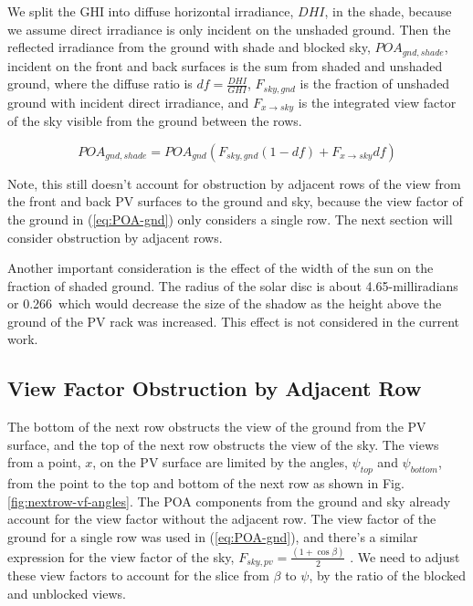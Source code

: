 \documentclass[conference]{IEEEtran}
\begin{document}
We split the GHI into diffuse horizontal irradiance, $DHI$, in the shade, because we assume direct irradiance is only incident on the unshaded ground.  Then the reflected irradiance from the ground with shade and blocked sky, $POA_{gnd,shade}$, incident on the front and back surfaces is the sum from shaded and unshaded ground, where the diffuse ratio is $df=\frac{DHI}{GHI}$, $F_{sky,gnd}$ is the fraction of unshaded ground with incident direct irradiance, and $F_{x \rightarrow sky}$ is the integrated view factor of the sky visible from the ground between the rows.

\begin{equation}
POA_{gnd,shade} = POA_{gnd}\left(F_{sky,gnd} \left(1-df \right) + F_{x \rightarrow sky} df\right)
\label{eq:POA-gnd-shade}
\end{equation}

Note, this still doesn’t account for obstruction by adjacent rows of the view from the front and back PV surfaces to the ground and sky, because the view factor of the ground in (\ref{eq:POA-gnd}) only considers a single row. The next section will consider obstruction by adjacent rows.

Another important consideration is the effect of the width of the sun on the fraction of shaded ground. The radius of the solar disc is about 4.65-milliradians or 0.266\degree\ which would decrease the size of the shadow as the height above the ground of the PV rack was increased. This effect is not considered in the current work.

\subsection{View Factor Obstruction by Adjacent Row}
The bottom of the next row obstructs the view of the ground from the PV surface, and the top of the next row obstructs the view of the sky.  The views from a point, $x$, on the PV surface are limited by the angles, $\psi_{top}$ and $\psi_{bottom}$, from the point to the top and bottom of the next row as shown in Fig. \ref{fig:nextrow-vf-angles}.  The POA components from the ground and sky already account for the view factor without the adjacent row.  The view factor of the ground for a single row was used in (\ref{eq:POA-gnd}), and there's a similar expression for the view factor of the sky, $F_{sky,pv}=\frac{\left(1+\cos\beta\right)}{2}$ \cite{Marion2017}. We need to adjust these view factors to account for the slice from $\beta$ to $\psi$, by the ratio of the blocked and unblocked views.
\end{document}
